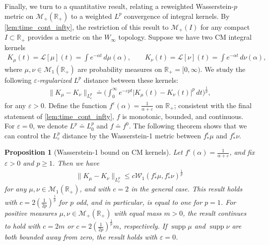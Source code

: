 \documentclass{cams-l} %
\newcommand{\RR}{\mathbb R}
\newcommand{\cL}{\mathcal L}
\newcommand{\cM}{\mathcal M}
\newcommand{\eps}{\varepsilon}
\newcommand{\supp}{\operatorname{supp}}
\newtheorem{proposition}[theorem]{Proposition}
\theoremstyle{definition}
\theoremstyle{remark}
\numberwithin{equation}{section}
\begin{document}
Finally, we turn to a quantitative result, relating a reweighted Wasserstein-$p$ metric on $\cM_+(\RR_+)$ to a weighted $L^p$ convergence of integral kernels. By \cref{lem:time_cont_infty}, the restriction of this result to $\cM_+(I)$ for any compact $I\subset\RR_+$ provides a metric on the $W_\infty$ topology. Suppose we have two CM integral kernels
\begin{align*}
    K_{\mu}(t) = \cL[\mu](t) = \int e^{-\alpha t}\,d\mu(\alpha), \qquad K_{\nu}(t) = \cL[\nu](t) = \int e^{-\alpha t}\,d\nu(\alpha),
\end{align*}
where $\mu, \nu \in \cM_1(\RR_+)$ are probability measures on $\RR_+=[0,\infty)$. We study the following \emph{$\varepsilon$-regularized} $L^p$ distance between these kernels:
\begin{align*}
    \|K_{\mu} - K_{\nu}\|_{L_{\varepsilon}^p} \doteq \Big(\int_0^\infty e^{-\varepsilon pt}\big|K_{\mu}(t) - K_{\nu}(t)\big|^p\,dt\Big)^\frac{1}{p},
\end{align*}
for any $\varepsilon > 0$. Define the function $f^\eps(\alpha) = \tfrac{1}{\alpha + \varepsilon}$ on $\RR_+$; consistent with the final statement of \cref{lem:time_cont_infty}, $f$ is monotonic, bounded, and continuous. For $\varepsilon = 0$, we denote $L^p \doteq  L_0^p$ and $f \doteq f^0$. The following theorem shows that we can control the $L_{\varepsilon}^p$ distance by the Wasserstein-1 metric between $f^\epsilon_*\mu$ and $f^\varepsilon_*\nu$.
\begin{proposition}[Wasserstein-1 bound on CM kernels]\label{prop:wasserstein1}
    Let $f^\varepsilon(\alpha) = \tfrac{1}{\alpha + \varepsilon}$, and fix $\eps>0$ and $p\geq 1$. Then we have
    \begin{align*}
        \|K_{\mu} - K_{\nu}\|_{L_{\varepsilon}^p} \leq c\mathcal{W}_1(f^\varepsilon_*\mu, f^\varepsilon_*\nu)^\frac{1}{p}
    \end{align*}
    for any $\mu, \nu \in \cM_1(\RR_+)$, and with $c=2$ in the general case. This result holds with $c=2(\tfrac{1}{2p})^\frac{1}{p}$ for $p$ odd, and in particular, is equal to one for $p = 1$. For positive measures $\mu, \nu \in \cM_+(\RR_+)$ with equal mass $m>0$, the result continues to hold with $c=2m$ or $c = 2(\tfrac{1}{2p})^\frac{1}{p}m$, respectively. If $\supp\mu$ and $\supp\nu$ are both bounded away from zero, the result holds with $\eps=0$.
\end{proposition}
\end{document}

